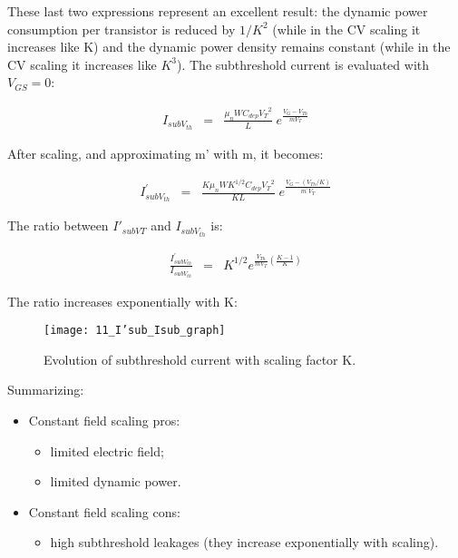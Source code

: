 \documentclass[a4paper, 12pt, twoside, openright]{report}
\begin{document}
\begin{enumerate}
These last two expressions represent an excellent result: the dynamic power consumption per transistor is reduced by $1/K^{2}$ (while in the CV scaling it increases like K) and the dynamic power density remains constant (while in the CV scaling it increases like $K^{3}$).
The subthreshold current is evaluated with $V_{GS} = 0$:

	\begin{eqnarray*}
	I_{subV_{th}} & = &\frac{\mu_n W C_{dep} {V_T}^2}{L}\;e^{\displaystyle \frac{ {V_G-V_{Th}}}{ mV_T}}
	\end{eqnarray*}

After scaling, and approximating m' with m, it becomes:

	\begin{eqnarray*}
	I_{subV_{th}}^{\prime} & = &\frac{K \mu_n W K^{1/2} C_{dep} {V_T}^2}{K L}\;e^{\displaystyle \frac{ {V_G-(V_{Th}/K)}}{ m^{\prime}V_T}}
	\end{eqnarray*}

The ratio between $I'_{subVT}$ and $I_{subV_{th}}$ is:

	\begin{eqnarray*}
	\frac{I_{subV_{th}}^{\prime}}{I_{subV_{th}}} & =& K^{1/2} e^{\frac{V_{Th}}{mV_T}\left( \frac{K-1}{K}\right)}
	\end{eqnarray*}

The ratio increases exponentially with K:

	\begin{figure}[H]
	\centering
	\texttt{[image: 11\_I'sub\_Isub\_graph]}
	\caption{Evolution of subthreshold current with scaling factor K.}
	\label{}
	\end{figure}

Summarizing:

\begin{itemize}
\item Constant field scaling pros:
	\begin{itemize}
	\item limited electric field;
	\item limited dynamic power.
	\end{itemize}
\item Constant field scaling cons:
	\begin{itemize}
	\item high subthreshold leakages (they increase exponentially with scaling).
	\end{itemize}
\end{itemize}


\end{enumerate}
\end{document}
